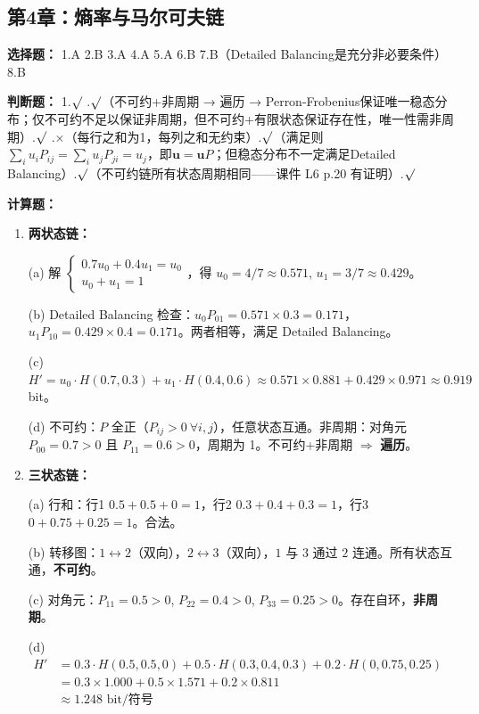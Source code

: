 \documentclass[12pt,a4paper]{ctexart}
\begin{document}
\subsection*{第4章：熵率与马尔可夫链}

\textbf{选择题：} 1.A \quad 2.B \quad 3.A \quad 4.A \quad 5.A \quad 6.B \quad 7.B（Detailed Balancing是充分非必要条件）\quad 8.B

\textbf{判断题：}
1.$\surd$ .$\surd$（不可约+非周期 → 遍历 → Perron-Frobenius保证唯一稳态分布；仅不可约不足以保证非周期，但不可约+有限状态保证存在性，唯一性需非周期）.$\surd$ .$\times$（每行之和为1，每列之和无约束）.$\surd$（满足则$\sum_i u_i P_{ij}=\sum_i u_j P_{ji}=u_j$，即$\mathbf{u}=\mathbf{u}P$；但稳态分布不一定满足Detailed Balancing）.$\surd$（不可约链所有状态周期相同——课件 L6 p.20 有证明）.$\surd$

\textbf{计算题：}
\begin{enumerate}[leftmargin=*]

\item[(1)] \textbf{两状态链：}

(a) 解 $\begin{cases} 0.7u_0+0.4u_1=u_0 \\ u_0+u_1=1 \end{cases}$，得 $u_0=4/7\approx0.571$, $u_1=3/7\approx0.429$。

(b) Detailed Balancing 检查：$u_0 P_{01}=0.571\times0.3=0.171$，$u_1 P_{10}=0.429\times0.4=0.171$。两者相等，满足 Detailed Balancing。

(c) $H' = u_0\cdot H(0.7,0.3) + u_1\cdot H(0.4,0.6) \approx 0.571\times0.881 + 0.429\times0.971 \approx 0.919$ bit。

(d) 不可约：$P$ 全正（$P_{ij}>0\ \forall i,j$），任意状态互通。非周期：对角元 $P_{00}=0.7>0$ 且 $P_{11}=0.6>0$，周期为 1。不可约+非周期 $\Rightarrow$ \textbf{遍历}。

\item[(2)] \textbf{三状态链：}

(a) 行和：行1 $0.5+0.5+0=1$，行2 $0.3+0.4+0.3=1$，行3 $0+0.75+0.25=1$。合法。

(b) 转移图：$1\leftrightarrow2$（双向），$2\leftrightarrow3$（双向），$1$ 与 $3$ 通过 $2$ 连通。所有状态互通，\textbf{不可约}。

(c) 对角元：$P_{11}=0.5>0$, $P_{22}=0.4>0$, $P_{33}=0.25>0$。存在自环，\textbf{非周期}。

(d) $\begin{aligned} H' &= 0.3\cdot H(0.5,0.5,0) + 0.5\cdot H(0.3,0.4,0.3) + 0.2\cdot H(0,0.75,0.25) \\
&= 0.3\times1.000 + 0.5\times1.571 + 0.2\times0.811 \\
&\approx 1.248 \text{ bit/符号} \end{aligned}$
\end{enumerate}
\end{document}
